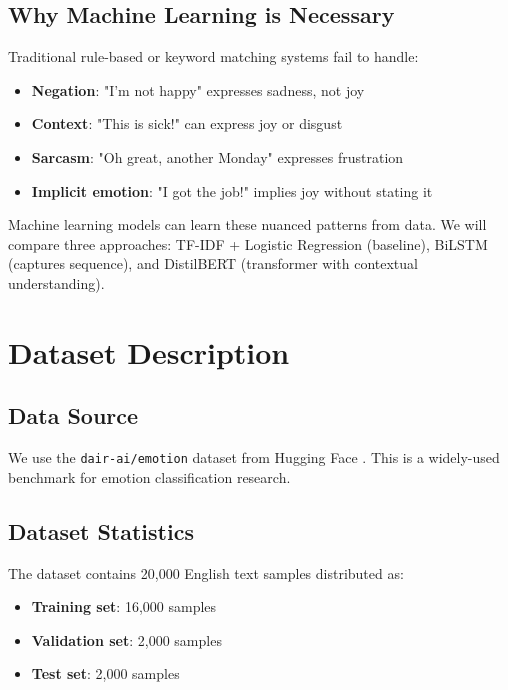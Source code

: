 \documentclass[12pt,a4paper]{article}
\begin{document}
\subsection{Why Machine Learning is Necessary}
Traditional rule-based or keyword matching systems fail to handle:
\begin{itemize}
    \item \textbf{Negation}: "I'm not happy" expresses sadness, not joy
    \item \textbf{Context}: "This is sick!" can express joy or disgust
    \item \textbf{Sarcasm}: "Oh great, another Monday" expresses frustration
    \item \textbf{Implicit emotion}: "I got the job!" implies joy without stating it
\end{itemize}

Machine learning models can learn these nuanced patterns from data. We will compare three approaches: TF-IDF + Logistic Regression (baseline), BiLSTM (captures sequence), and DistilBERT (transformer with contextual understanding).

\section{Dataset Description}

\subsection{Data Source}
We use the \texttt{dair-ai/emotion} dataset from Hugging Face \cite{emotion_dataset}. This is a widely-used benchmark for emotion classification research.

\subsection{Dataset Statistics}
The dataset contains 20,000 English text samples distributed as:
\begin{itemize}
    \item \textbf{Training set}: 16,000 samples
    \item \textbf{Validation set}: 2,000 samples
    \item \textbf{Test set}: 2,000 samples
\end{itemize}
\end{document}
